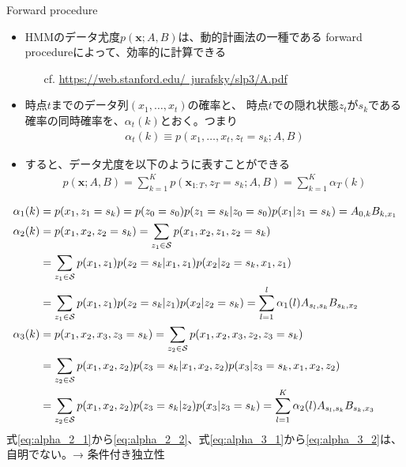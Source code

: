\documentclass[aspectratio=169,unicode,dvipdfmx,14pt]{beamer}
\begin{document}
\begin{frame}{Forward procedure}
\begin{itemize}
\item HMMのデータ尤度$p(\bm{x}; A,B)$は、動的計画法の一種である
forward procedureによって、効率的に計算できる
\begin{itemize}
\item[cf.] \href{https://web.stanford.edu/~jurafsky/slp3/A.pdf}{https://web.stanford.edu/~jurafsky/slp3/A.pdf}
\end{itemize}
\item 時点$t$までのデータ列$(x_1,\ldots,x_t)$の確率と、
時点$t$での隠れ状態$z_t$が$s_k$である確率の同時確率を、$\alpha_t(k)$とおく。つまり
\begin{align}
\alpha_t(k) \equiv p(x_1,\ldots, x_t, z_t=s_k; A, B)
\end{align}
\item すると、データ尤度を以下のように表すことができる
\begin{align}
p(\bm{x}; A,B) = \sum_{k=1}^K p(\bm{x}_{1:T}, z_T=s_k; A,B) = \sum_{k=1}^K \alpha_T(k)
\end{align}
\end{itemize}
\end{frame}

\begin{frame}{}
\FontMath
\vspace{-.25in}
\begin{align}
\alpha_1(k) & = p(x_1,z_1=s_k) = p(z_0=s_0)p(z_1=s_k|z_0=s_0)p(x_1|z_1=s_k) = A_{0,k} B_{k,x_1}
\\ 
\alpha_2(k) & = p(x_1, x_2, z_2=s_k) = \sum_{z_1 \in \mathcal{S}} p(x_1,x_2, z_1, z_2=s_k)
\notag \\ &
= \sum_{z_1 \in \mathcal{S}} p(x_1,z_1) p(z_2=s_k|x_1, z_1) p(x_2|z_2=s_k, x_1, z_1)
\label{eq:alpha_2_1} \\ &
= \sum_{z_1 \in \mathcal{S}} p(x_1,z_1) p(z_2=s_k|z_1) p(x_2|z_2=s_k)
= \sum_{l=1}^l \alpha_1(l) A_{s_l,s_k} B_{s_k,x_2}
\label{eq:alpha_2_2} \\
\alpha_3(k) & = p(x_1,x_2,x_3,z_3=s_k) = \sum_{z_2 \in \mathcal{S}} p(x_1,x_2, x_3, z_2, z_3=s_k)
\notag \\ &
= \sum_{z_2 \in \mathcal{S}} p(x_1,x_2, z_2) p(z_3=s_k|x_1,x_2,z_2) p(x_3|z_3=s_k,x_1,x_2,z_2)
\label{eq:alpha_3_1} \\ &
= \sum_{z_2 \in \mathcal{S}} p(x_1,x_2,z_2) p(z_3=s_k|z_2) p(x_3|z_3=s_k)
= \sum_{l=1}^K \alpha_2(l) A_{s_l,s_k} B_{s_k, x_3}
\label{eq:alpha_3_2} 
\end{align}
式\eqref{eq:alpha_2_1}から\eqref{eq:alpha_2_2}、式\eqref{eq:alpha_3_1}から\eqref{eq:alpha_3_2}は、自明でない。→ 条件付き独立性
\end{frame}
\end{document}
